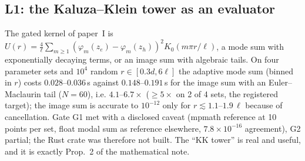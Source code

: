 \documentclass[11pt,a4paper]{article}
\begin{document}
\subsection{L1: the Kaluza--Klein tower as an evaluator}
The gated kernel of paper~I is $U(r)=\frac{4}{\ell}\sum_{m\ge1}(\varphi_m(z_e)-\varphi_m(z_h))^2K_0(m\pi r/\ell)$, a mode sum with
exponentially decaying terms, or an image sum with algebraic tails. On four parameter sets and $10^4$ random $r\in[0.3d,6\ell]$ the
adaptive mode sum (binned in $r$) costs $0.028$--$0.036$\,s against $0.148$--$0.191$\,s for the image sum with an Euler--Maclaurin
tail ($N=60$), i.e. $4.1$--$6.7\times$ ($\ge5\times$ on 2 of 4 sets, the registered target); the image sum is accurate to $10^{-12}$
only for $r\lesssim1.1$--$1.9\,\ell$ because of cancellation. Gate G1 met with a disclosed caveat (mpmath reference at 10 points per
set, float modal sum as reference elsewhere, $7.8\times10^{-16}$ agreement), G2 partial; the Rust crate was therefore not built. The
``KK tower'' is real and useful, and it is exactly Prop.~2 of the mathematical note.
\end{document}
